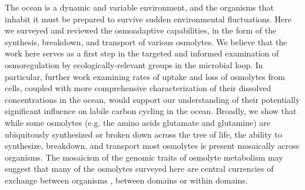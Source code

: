 \documentclass[utf8]{frontiersSCNS} %
\begin{document}
The ocean is a dynamic and variable environment, and the organisms that inhabit it must be prepared to survive sudden environmental fluctuations. Here we surveyed and reviewed the osmoadaptive capabilities, in the form of the synthesis, breakdown, and transport of various osmolytes. We believe that the work here serves as a first step in the targeted and informed examination of osmoregulation by ecologically-relevant groups in the microbial loop. In particular, further work examining rates of uptake and loss of osmolytes from cells, coupled with more comprehensive characterization of their dissolved concentrations in the ocean, would support our understanding of their potentially significant influence on labile carbon cycling in the ocean. Broadly, we show that while some osmolytes (e.g. the amino acids glutamate and glutamine) are ubiquitously synthesized or broken down across the tree of life, the ability to synthesize, breakdown, and transport most osmolytes is present mosaically across organisms. The mosaicism of the genomic traits of osmolyte metabolism may suggest that many of the osmolytes surveyed here are central currencies of exchange between organisms \citep{Moran2016}, between domains or within domains. 
\end{document}
